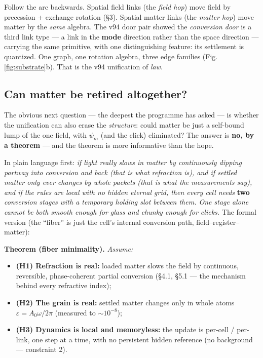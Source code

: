 Follow the arc backwards. Spatial field links (the \emph{field hop})
move field by precession + exchange rotation (§3). Spatial matter links
(the \emph{matter hop}) move matter by the \emph{same} algebra. The v94
door pair showed the \emph{conversion door} is a third link type --- a
link in the \textbf{mode} direction rather than the space direction ---
carrying the same primitive, with one distinguishing feature: its
settlement is quantized. One graph, one rotation algebra, three edge
families (Fig. \ref{fig:substrate}b). That is the v94 unification of
\emph{law}.

\subsection{Can matter be retired
altogether?}\label{can-matter-be-retired-altogether}

The obvious next question --- the deepest the programme has asked --- is
whether the unification can also erase the \emph{structure}: could
matter be just a self-bound lump of the one field, with \(\psi_m\) (and
the click) eliminated? The answer is \textbf{no, by a theorem} --- and
the theorem is more informative than the hope.

In plain language first: \emph{if light really slows in matter by
continuously dipping partway into conversion and back (that is what
refraction is), and if settled matter only ever changes by whole packets
(that is what the measurements say), and if the rules are local with no
hidden eternal grid, then every cell needs} \textbf{two}
\emph{conversion stages with a temporary holding slot between them. One
stage alone cannot be both smooth enough for glass and chunky enough for
clicks.} The formal version (the ``fiber'' is just the cell's internal
conversion path, field--register--matter):

\textbf{Theorem (fiber minimality).} \emph{Assume:}

\begin{itemize}
\tightlist
\item
  \textbf{(H1) Refraction is real:} loaded matter slows the field by
  continuous, reversible, phase-coherent partial conversion (§4.1, §5.1
  --- the mechanism behind every refractive index);
\item
  \textbf{(H2) The grain is real:} settled matter changes only in whole
  atoms \(\varepsilon = A_0\omega/2\pi\) (measured to \(\sim 10^{-8}\));
\item
  \textbf{(H3) Dynamics is local and memoryless:} the update is per-cell
  / per-link, one step at a time, with no persistent hidden reference
  (no background --- constraint 2).
\end{itemize}

